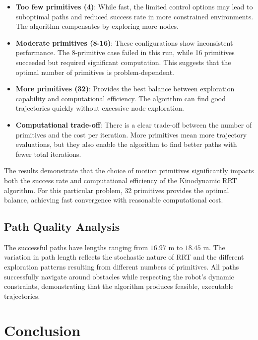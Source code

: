 \documentclass[11pt]{article}
\begin{document}
\begin{itemize}
    \item \textbf{Too few primitives (4)}: While fast, the limited control options may lead to suboptimal paths and reduced success rate in more constrained environments. The algorithm compensates by exploring more nodes.

    \item \textbf{Moderate primitives (8-16)}: These configurations show inconsistent performance. The 8-primitive case failed in this run, while 16 primitives succeeded but required significant computation. This suggests that the optimal number of primitives is problem-dependent.

    \item \textbf{More primitives (32)}: Provides the best balance between exploration capability and computational efficiency. The algorithm can find good trajectories quickly without excessive node exploration.

    \item \textbf{Computational trade-off}: There is a clear trade-off between the number of primitives and the cost per iteration. More primitives mean more trajectory evaluations, but they also enable the algorithm to find better paths with fewer total iterations.
\end{itemize}

The results demonstrate that the choice of motion primitives significantly impacts both the success rate and computational efficiency of the Kinodynamic RRT algorithm. For this particular problem, 32 primitives provides the optimal balance, achieving fast convergence with reasonable computational cost.

\subsection{Path Quality Analysis}

The successful paths have lengths ranging from $16.97$ m to $18.45$ m. The variation in path length reflects the stochastic nature of RRT and the different exploration patterns resulting from different numbers of primitives. All paths successfully navigate around obstacles while respecting the robot's dynamic constraints, demonstrating that the algorithm produces feasible, executable trajectories.

\section{Conclusion}
\end{document}
